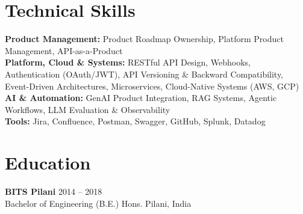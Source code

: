 \documentclass[10pt, a4paper]{article}
\begin{document}
\section*{Technical Skills}
\vspace{-0.1em}
{\small
\textbf{Product Management:} Product Roadmap Ownership, Platform Product Management, API-as-a-Product \\
\textbf{Platform, Cloud \& Systems:} RESTful API Design, Webhooks, Authentication (OAuth/JWT), API Versioning \& Backward Compatibility, Event-Driven Architectures, Microservices, Cloud-Native Systems (AWS, GCP) \\
\textbf{AI \& Automation:} GenAI Product Integration, RAG Systems, Agentic Workflows, LLM Evaluation \& Observability \\
\textbf{Tools:} Jira, Confluence, Postman, Swagger, GitHub, Splunk, Datadog
}

\section*{Education}
\vspace{-0.1em}
{\small \textbf{BITS Pilani} \hfill 2014 -- 2018 \\
Bachelor of Engineering (B.E.) Hons. \hfill Pilani, India}
\end{document}
